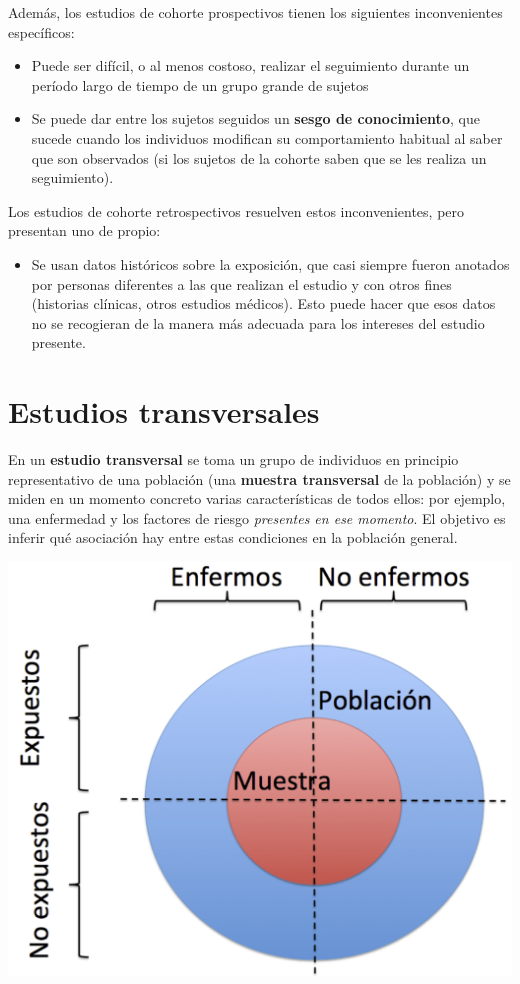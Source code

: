 \documentclass[
]{book}
\providecommand{\tightlist}{%
  \setlength{\itemsep}{0pt}\setlength{\parskip}{0pt}}
\theoremstyle{definition}
\theoremstyle{definition}
\theoremstyle{definition}
\theoremstyle{definition}
\theoremstyle{remark}
\begin{document}
Además, los estudios de cohorte prospectivos tienen los siguientes inconvenientes específicos:

\begin{itemize}
\item
  Puede ser difícil, o al menos costoso, realizar el seguimiento durante un período largo de tiempo de un grupo grande de sujetos
\item
  Se puede dar entre los sujetos seguidos un \textbf{sesgo de conocimiento}, que sucede cuando los individuos modifican su comportamiento habitual al saber que son observados (si los sujetos de la cohorte saben que se les realiza un seguimiento).
\end{itemize}

Los estudios de cohorte retrospectivos resuelven estos inconvenientes, pero presentan uno de propio:

\begin{itemize}
\tightlist
\item
  Se usan datos históricos sobre la exposición, que casi siempre fueron anotados por personas diferentes a las que realizan el estudio y con otros fines (historias clínicas, otros estudios médicos). Esto puede hacer que esos datos no se recogieran de la manera más adecuada para los intereses del estudio presente.
\end{itemize}

\hypertarget{estudios-transversales}{%
\section{Estudios transversales}\label{estudios-transversales}}

En un \textbf{estudio transversal} se toma un grupo de individuos en principio representativo de una población (una \textbf{muestra transversal} de la población) y se miden en un momento concreto varias características de todos ellos: por ejemplo, una enfermedad y los factores de riesgo \emph{presentes en ese momento}. El objetivo es inferir qué asociación hay entre estas condiciones en la población general.

\begin{center}\includegraphics[width=0.6\linewidth]{INREMDN_files/figure-html/transversal} \end{center}
\end{document}
